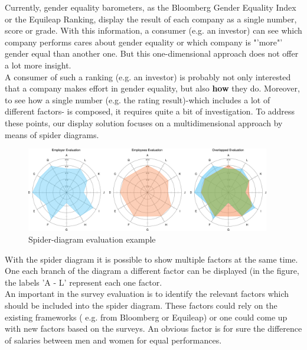 


Currently, gender equality barometers, as the Bloomberg Gender Equality Index or the Equileap Ranking, display the result of each company as a single number, score or grade. With this information, a consumer (e.g. an investor) can see which company performs cares about gender equality or which company is "'more"' gender equal than another one. But this one-dimensional approach does not offer a lot more insight.\\
A consumer of such a ranking (e.g. an investor) is probably not only interested that a company makes effort in gender equality, but also \textbf{how} they do.
Moreover, to see how a single number (e.g. the rating result)-which includes a lot of different factors- is composed, it requires quite a bit of investigation.
To address these points, our display solution focuses on a multidimensional approach by means of spider diagrams.\\

\begin{figure}[H]
	\includegraphics[width=0.95\textwidth]{Bilder/spider-eval}
	\caption{Spider-diagram evaluation example}
	\label{Spider_diagram_evaluation}
\end{figure}

With the spider diagram it is possible to show multiple factors at the same time. One each branch of the diagram a different factor can be displayed (in the figure, the labels 'A - L' represent each one factor.\\
An important in the survey evaluation is to identify the relevant factors which should be included into the spider diagram. These factors could rely on the existing frameworks ( e.g. from Bloomberg or Equileap) or one could come up with new factors based on the surveys. An obvious factor is for sure the difference of salaries between men and women for equal performances.\\
 
